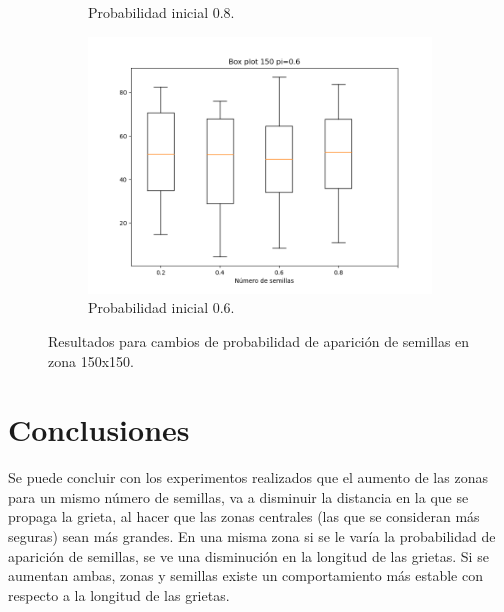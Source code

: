 \documentclass{article}
\begin{document}
\begin{figure}
\begin{subfigure}[b]{0.45\linewidth}
			\caption{Probabilidad inicial 0.8.}
			\label{08}
	\end{subfigure}
		\begin{subfigure}[b]{0.45\linewidth}
			\includegraphics[width=\linewidth]{Figp6.png}
			\caption{Probabilidad inicial 0.6.}
			\label{06}
	\end{subfigure}
	\caption{Resultados para cambios de probabilidad de aparición de semillas en zona 150x150.}  		
\end{figure}

\section{Conclusiones}
Se puede concluir con los experimentos realizados que el aumento de las zonas para un mismo número de semillas, va a disminuir la distancia en la que se propaga la grieta, al hacer que las zonas centrales (las que se consideran más seguras) sean más grandes. En una misma zona si se le varía la probabilidad de aparición de semillas, se ve una disminución en la longitud de las grietas. Si se aumentan ambas, zonas y semillas existe un comportamiento más estable con respecto a la longitud de las grietas.



\end{document}
